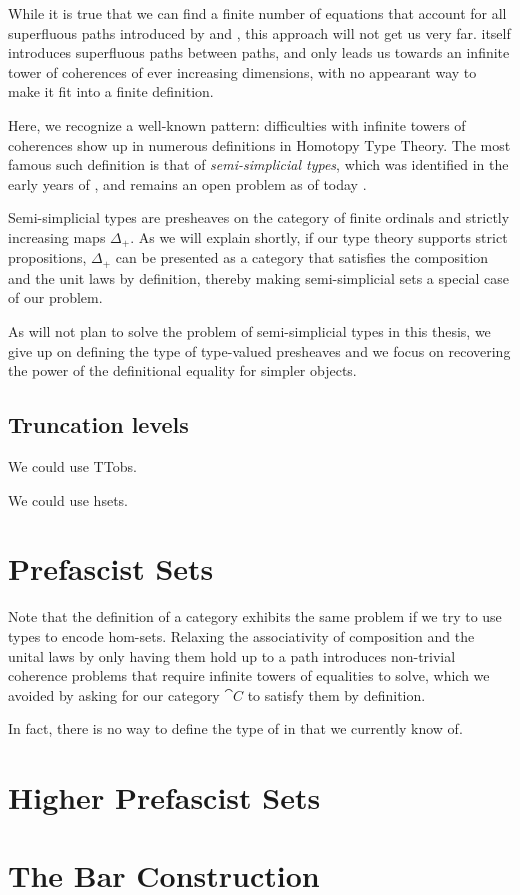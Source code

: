 While it is true that we can find a finite number of equations that account for 
all superfluous paths introduced by  and , this 
approach will not get us very far. 
% 
 itself introduces superfluous paths between paths, and only
leads us towards an infinite tower of coherences of ever increasing 
dimensions, with no appearant way to make it fit into a finite definition.

Here, we recognize a well-known pattern: difficulties with infinite 
towers of coherences show up in numerous definitions in Homotopy Type Theory.
% 
The most famous such definition is that of \emph{semi-simplicial types}, 
which was identified in the early years of \HoTT, and remains an open problem 
as of today .

Semi-simplicial types are presheaves on the category of finite ordinals and 
strictly increasing maps \( \Delta_+ \).
% 
As we will explain shortly, if our type theory supports strict propositions,
\( \Delta_+ \) can be presented as a category that satisfies the composition
and the unit laws by definition, thereby making semi-simplicial sets a special
case of our problem.

As will not plan to solve the problem of semi-simplicial types in this thesis, 
we give up on defining the type of type-valued presheaves and we focus on
recovering the power of the definitional equality for simpler objects.

\subsection{Truncation levels}

We could use TTobs.

We could use hsets.

\section{Prefascist Sets}

Note that the definition of a category exhibits the same problem if we try to
use types to encode hom-sets. 
% 
Relaxing the associativity of composition and the unital laws by only having
them hold up to a path introduces non-trivial coherence problems that require 
infinite towers of equalities to solve, which we avoided by asking for our
category \( \cat{C} \) to satisfy them by definition.

In fact, there is no way to define the type of  in \HoTT that we currently know of. 

\section{Higher Prefascist Sets}

\section{The Bar Construction}